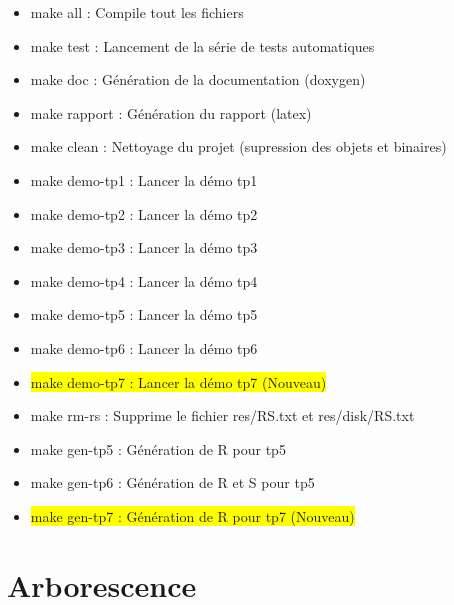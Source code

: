 \documentclass[a4paper]{article}
\begin{document}
\begin{itemize}
	\item make all : Compile tout les fichiers
	\item make test : Lancement de la série de tests automatiques
	\item make doc  : Génération de la documentation (doxygen)
	\item make rapport : Génération du rapport (latex)
	\item make clean : Nettoyage du projet (supression des objets et binaires)
	\item make demo-tp1 : Lancer la démo tp1
	\item make demo-tp2 : Lancer la démo tp2
	\item make demo-tp3 : Lancer la démo tp3
	\item make demo-tp4 : Lancer la démo tp4
	\item make demo-tp5 : Lancer la démo tp5
  \item make demo-tp6 : Lancer la démo tp6
  \item \colorbox{yellow}{make demo-tp7 : Lancer la démo tp7 (Nouveau)}
	\item make rm-rs : Supprime le fichier res/RS.txt et res/disk/RS.txt
  \item make gen-tp5 : Génération de R pour tp5
  \item make gen-tp6 : Génération de R et S pour tp5
  \item \colorbox{yellow}{make gen-tp7 : Génération de R pour tp7 (Nouveau)}
\end{itemize}

\section{Arborescence}
\end{document}
